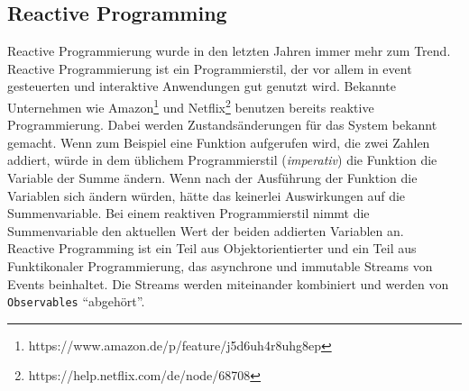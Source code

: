 \subsection{Reactive Programming}
Reactive Programmierung wurde in den letzten Jahren immer mehr zum Trend\cite{Bainomugisha2013}. Reactive Programmierung ist ein Programmierstil, der vor allem in event gesteuerten und interaktive Anwendungen gut genutzt wird. Bekannte Unternehmen wie Amazon\footnote{https://www.amazon.de/p/feature/j5d6uh4r8uhg8ep} und Netflix\footnote{https://help.netflix.com/de/node/68708} benutzen bereits reaktive Programmierung. Dabei werden Zustands\"anderungen f\"ur das System bekannt gemacht. Wenn zum Beispiel eine Funktion aufgerufen wird, die zwei Zahlen addiert, w\"urde in dem \"ublichem Programmierstil (\textit{imperativ}) die Funktion die Variable der Summe \"andern. Wenn nach der Ausf\"uhrung der Funktion die Variablen sich \"andern w\"urden, h\"atte das keinerlei Auswirkungen auf die Summenvariable. Bei einem reaktiven Programmierstil nimmt die Summenvariable den aktuellen Wert der beiden addierten Variablen an\cite{Lambert2016}. \\
Reactive Programming ist ein Teil aus Objektorientierter und ein Teil aus Funktikonaler Programmierung, das asynchrone und immutable Streams von Events beinhaltet. Die Streams werden miteinander kombiniert und werden von \texttt{Observables} \enquote{abgeh\"ort}. 
